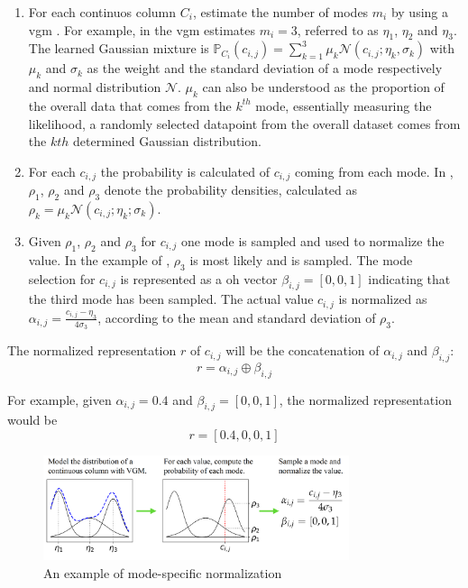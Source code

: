 \begin{enumerate}
    \item For each continuos column $C_i$, estimate the number of modes $m_i$ by using a \gls{vgm} \cite{bishop2006PatternRecognitionMachine}. 
    For example, in  the \gls{vgm} estimates $m_i=3$, referred to as $\eta_1$, $\eta_2$ and $\eta_3$. 
    The learned Gaussian mixture is  
    $\mathbb{P}_{C_i}(c_{i,j})=\sum_{k=1}^{3}\mu_k\mathcal{N}(c_{i,j};\eta_k, \sigma_k)$
    with $\mu_k$ and $\sigma_k$ as the weight and the standard deviation of a mode respectively and normal distribution $\mathcal{N}$.
    $\mu_k$ can also be understood as the proportion of the overall data that comes from the $k^{th}$ mode, essentially measuring the likelihood, a randomly selected datapoint from the overall dataset comes from the $kth$ determined Gaussian distribution.
    \item For each $c_{i,j}$ the probability is calculated of $c_{i,j}$ coming from each mode. 
    In , $\rho_1$, $\rho_2$ and $\rho_3$ denote the probability densities, calculated as $\rho_k=\mu_k\mathcal{N}(c_{i,j};\eta_k;\sigma_k)$.
    \item Given $\rho_1$, $\rho_2$ and $\rho_3$ for $c_{i,j}$ one mode is sampled and used to normalize the value. 
    In the example of , $\rho_3$ is most likely and is sampled.
    The mode selection for $c_{i,j}$ is represented as a \gls{oh} vector $\beta_{i,j}=[0,0,1]$ indicating that the third mode has been sampled.
    The actual value $c_{i,j}$ is normalized as $\alpha_{i,j}=\frac{c_{i,j}-\eta_3}{4\sigma_3}$, according to the mean and standard deviation of $\rho_3$. 
\end{enumerate}

The normalized representation $r$ of $c_{i,j}$ will be the concatenation of $\alpha_{i,j}$ and $\beta_{i,j}$: 
$$r=\alpha_{i,j}\oplus\beta_{i,j}$$

For example, given $\alpha_{i,j}=0.4$ and $\beta_{i,j}=[0,0,1]$, the normalized representation would be $$r=[0.4,0,0,1]$$

\begin{figure}[h]
    \centering
    \includegraphics[width=0.8\textwidth]{images/mode-normalization.png}
    \caption[Mode-Specific Normalization]{An example of mode-specific normalization \cite[Figure 1, p. 4]{xu2019ModelingTabularData}}
    \label{fig:mode-specific-normalization}
\end{figure}

